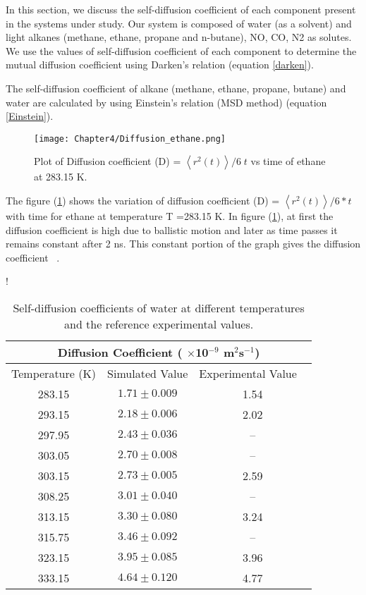 In this section, we discuss the self-diffusion coefficient of each component present in the systems under study. Our system is composed of water (as a solvent) and light alkanes (methane, ethane, propane and n-butane), NO, CO, N2 as solutes. We use the values of self-diffusion coefficient of each component
to determine the mutual diffusion coefficient using Darken's relation (equation \ref{darken}).

The self-diffusion coefficient of alkane (methane, ethane, propane, butane) and water are calculated by using Einstein's relation (MSD method) (equation \ref{Einstein}).

\begin{figure}[h!]
\centering
\texttt{[image: Chapter4/Diffusion\_ethane.png]}
\caption[Plot of Diffusion coefficient vs time of ethane at 283.15 K.]{Plot of Diffusion coefficient (D) = $\left\langle r^2(t)\right\rangle / 6\;t$ vs time of ethane at 283.15 K. }
\label{diffusionvstime}
\end{figure}


 The figure (\ref{diffusionvstime}) shows the variation of diffusion coefficient (D) = $\left\langle r^2(t)\right\rangle / 6*t$  with time for ethane at temperature T =283.15 K. In figure (\ref{diffusionvstime}),  at first the diffusion coefficient is high due to ballistic motion and later as time passes it remains constant after 2 ns. This constant portion of the graph gives the diffusion coefficient~ \citep{Pokhrel2016}.
 
 \begin{table}[H]
  \centering
  \caption[ Self-diffusion coefficients of water at different temperatures.]{Self-diffusion coefficients of water at different temperatures and the reference experimental values.} 
  \label{water_diffusion}
 \resizebox {0.60 \textwidth } {!}{%
  \begin{tabular}{| c| c | c| } \hline
 \multicolumn{3}{|c|}{Diffusion Coefficient ( $\times$10$^{-\mathrm{9}}$ m$^\mathrm{2}$s$^{-\mathrm{1}}$)} \\ \hline 
 Temperature (K) &  Simulated Value   &  Experimental Value ~\citep{easteal1989diaphragm} \\ \hline
 283.15 & $1.71\pm 0.009$ & 1.54  \\ \hline  
 293.15 & $2.18 \pm 0.006$ & 2.02    \\   \hline
 297.95 & $2.43\pm 0.036$ & -- \\   \hline
 303.05 & $ 2.70\pm 0.008$ & --   \\ \hline
 303.15 &  $ 2.73\pm 0.005$ & 2.59    \\ \hline
 308.25 &  $ 3.01\pm 0.040$ & --   \\ \hline
 313.15 &   $ 3.30\pm 0.080$ & 3.24    \\  \hline
 315.75 &   $ 3.46\pm 0.092$ & --   \\ \hline
 323.15 &  $ 3.95\pm 0.085$ & 3.96   \\ \hline
 333.15 & $ 4.64\pm 0.120$ & 4.77    \\ \hline
 \end{tabular}} 
 \end{table}  
 
